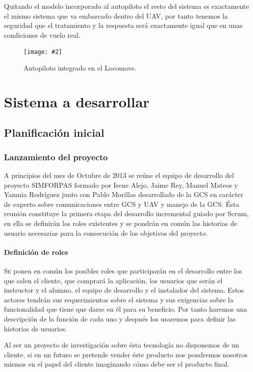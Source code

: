 \documentclass[12pt,a4paper,spanish]{book} %
\newcommand{\imgCentrada}[3]{
\begin{figure}[H]
\begin{center}
\texttt{[image: \#2]}
\caption{#3}
\label{#1}
\end{center}
\end{figure}
}
\begin{document}
\newpage
Quitando el modelo incorporado al autopiloto el resto del sistema es exactamente el mismo sistema que va embarcado dentro del UAV, por tanto tenemos la seguridad que el tratamiento y la respuesta será exactamente igual que en unas condiciones de vuelo real.

\imgCentrada{fig.2.27}{img/autopilotocatec.eps}{Autopiloto integrado en el Locomove.}




\part{Sistema a desarrollar}
\chapter{Planificación inicial}
\section{Lanzamiento del proyecto}

\lettrine{A}{} principios del mes de Octubre de 2013 se reúne el equipo de desarrollo del proyecto SIMFORPAS formado por Irene Alejo, Jaime Rey, Manuel Mateos y Yamnia Rodríguez junto con Pablo Morillas desarrollado de la GCS en carácter de experto sobre comunicaciones entre GCS y UAV y manejo de la GCS. Ésta reunión constituye la primera etapa del desarrollo incremental guiado por Scrum, en ella se definirán los roles existentes y se pondrán en común las historias de usuario necesarias para la consecución de los objetivos del proyecto.

\subsection{Definición de roles}

\lettrine{S}{e} ponen en común los posibles roles que participarán en el desarrollo entre los que salen el cliente, que comprará la aplicación, los usuarios que serán el instructor y el alumno, el equipo de desarrollo y el instalador del sistema. Estos actores tendrán sus requerimientos sobre el sistema y sus exigencias sobre la funcionalidad que tiene que darse en él para su beneficio. Por tanto haremos una descripción de la función de cada uno y después los usaremos para definir las historias de usuarios.

Al ser un proyecto de investigación sobre ésta tecnología no disponemos de un cliente, si en un futuro se pretende vender éste producto nos pondremos nosotros mismos en el papel del cliente imaginando cómo debe ser el producto final.
\end{document}
